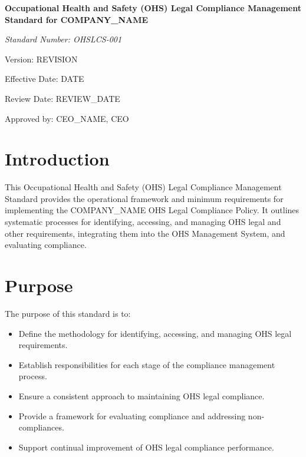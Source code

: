 \documentclass[12pt]{article}
\begin{document}
\begin{titlepage}
    \centering
    \vspace*{2cm}
    {\LARGE\bfseries Occupational Health and Safety (OHS) Legal Compliance Management Standard for {{COMPANY_NAME}}\par}
    \vspace{1cm}
    {\large\itshape Standard Number: OHSLCS-001\par}
    \vspace{0.5cm}
    {\normalsize Version: {{REVISION}}\par}
    \vspace{0.5cm}
    {\normalsize Effective Date: {{DATE}}\par}
    \vspace{0.5cm}
    {\normalsize Review Date: {{REVIEW_DATE}}\par}
    \vspace{2cm}
    {\normalsize Approved by: {{CEO_NAME}}, CEO\par}
\end{titlepage}

\section{Introduction}
This Occupational Health and Safety (OHS) Legal Compliance Management Standard provides the operational framework and minimum requirements for implementing the {{COMPANY_NAME}} OHS Legal Compliance Policy. It outlines systematic processes for identifying, accessing, and managing OHS legal and other requirements, integrating them into the OHS Management System, and evaluating compliance.

\section{Purpose}
The purpose of this standard is to:
\begin{itemize}
    \item Define the methodology for identifying, accessing, and managing OHS legal requirements.
    \item Establish responsibilities for each stage of the compliance management process.
    \item Ensure a consistent approach to maintaining OHS legal compliance.
    \item Provide a framework for evaluating compliance and addressing non-compliances.
    \item Support continual improvement of OHS legal compliance performance.
\end{itemize}
\end{document}

